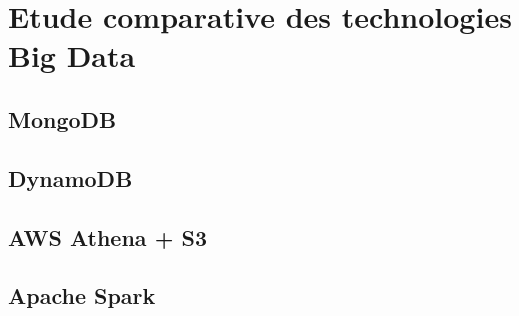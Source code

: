 \chapter{Etude comparative des technologies Big Data}

\section{MongoDB}


\section{DynamoDB}

\section{AWS Athena + S3}

\section{Apache Spark }